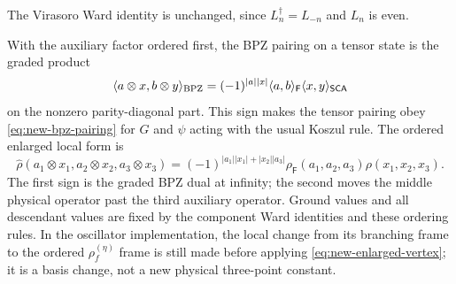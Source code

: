 The Virasoro Ward identity is unchanged, since
$L_n^\dagger=L_{-n}$ and $L_n$ is even.

With the auxiliary factor ordered first, the BPZ pairing on a tensor
state is the graded product
\begin{equation}
 \langle a\otimes x,b\otimes y\rangle_{\rm BPZ}
 =(-1)^{|a||x|}
   \langle a,b\rangle_{\mathsf F}\langle x,y\rangle_{\mathsf{SCA}}
 \label{eq:new-tensor-gram}
\end{equation}
on the nonzero parity-diagonal part.  This sign makes the tensor
pairing obey \eqref{eq:new-bpz-pairing} for $G$ and $\psi$ acting with
the usual Koszul rule.  The ordered enlarged local form is
\begin{equation}
 \widehat\rho(a_1\otimes x_1,a_2\otimes x_2,a_3\otimes x_3)
 =(-1)^{|a_1||x_1|+|x_2||a_3|}
   \rho_{\mathsf F}(a_1,a_2,a_3)\rho(x_1,x_2,x_3).
 \label{eq:new-enlarged-vertex}
\end{equation}
The first sign is the graded BPZ dual at infinity; the second moves
the middle physical operator past the third auxiliary operator.
Ground values and all descendant values are fixed by the component
Ward identities and these ordering rules.  In the oscillator
implementation, the local change from its branching frame to the
ordered $\rho_f^{(\eta)}$ frame is still made before applying
\eqref{eq:new-enlarged-vertex}; it is a basis change, not a new
physical three-point constant.

